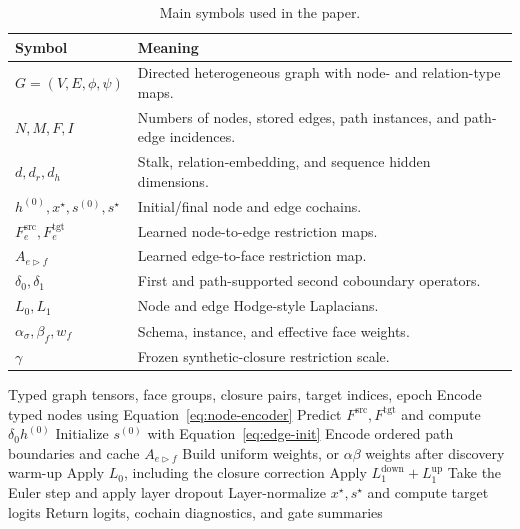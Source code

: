 \documentclass{article}
\newcommand{\method}{\textsc{H2S-NN}}
\begin{document}
\begin{table}[h]
  \centering
  \caption{Main symbols used in the paper.}
  \small
  \begin{tabularx}{\textwidth}{lX}
    \toprule
    \textbf{Symbol} & \textbf{Meaning} \\
    \midrule
    $G=(V,E,\phi,\psi)$ & Directed heterogeneous graph with node- and relation-type maps. \\
    $N,M,F,I$ & Numbers of nodes, stored edges, path instances, and path-edge incidences. \\
    $d,d_r,d_h$ & Stalk, relation-embedding, and sequence hidden dimensions. \\
    $h^{(0)},x^\star,s^{(0)},s^\star$ & Initial/final node and edge cochains. \\
    $F_e^{\mathrm{src}},F_e^{\mathrm{tgt}}$ & Learned node-to-edge restriction maps. \\
    $A_{e\triangleright f}$ & Learned edge-to-face restriction map. \\
    $\delta_0,\delta_1$ & First and path-supported second coboundary operators. \\
    $L_0,L_1$ & Node and edge Hodge-style Laplacians. \\
    $\alpha_\sigma,\beta_f,w_f$ & Schema, instance, and effective face weights. \\
    $\gamma$ & Frozen synthetic-closure restriction scale. \\
    \bottomrule
  \end{tabularx}
\end{table}

\begin{algorithm}[h]
  \caption{\method{} forward pass for node classification}
  \begin{algorithmic}[1]
    \Require Typed graph tensors, face groups, closure pairs, target indices, epoch
    \State Encode typed nodes using Equation~\ref{eq:node-encoder}
    \State Predict $F^{\mathrm{src}},F^{\mathrm{tgt}}$ and compute $\delta_0h^{(0)}$
    \State Initialize $s^{(0)}$ with Equation~\ref{eq:edge-init}
    \State Encode ordered path boundaries and cache $A_{e\triangleright f}$
    \State Build uniform weights, or $\alpha\beta$ weights after discovery warm-up
      \State Apply $L_0$, including the closure correction
      \State Apply $L_1^{\mathrm{down}}+L_1^{\mathrm{up}}$
      \State Take the Euler step and apply layer dropout
    \EndFor
    \State Layer-normalize $x^\star,s^\star$ and compute target logits
    \State Return logits, cochain diagnostics, and gate summaries
  \end{algorithmic}
\end{algorithm}
\end{document}
